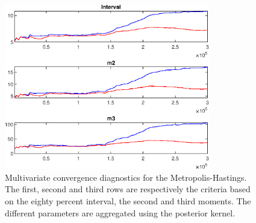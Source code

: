  
\begin{figure}[H]
\centering 
\includegraphics[width=0.8\textwidth]{BRS_growth/Output/BRS_growth_mdiag}
\caption{Multivariate convergence diagnostics for the Metropolis-Hastings.
The first, second and third rows are respectively the criteria based on
the eighty percent interval, the second and third moments. The different 
parameters are aggregated using the posterior kernel.}\label{Fig:MultivariateDiagnostics}
\end{figure}

